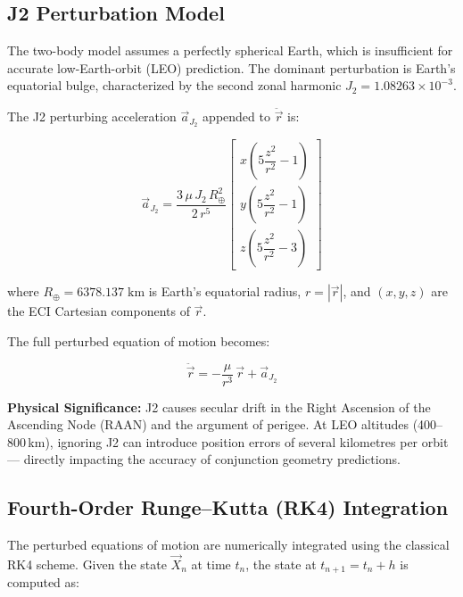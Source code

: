 \documentclass[11pt, a4paper]{article}
\begin{document}
\subsection{J2 Perturbation Model}

The two-body model assumes a perfectly spherical Earth, which is insufficient for accurate
low-Earth-orbit (LEO) prediction. The dominant perturbation is Earth's equatorial bulge,
characterized by the second zonal harmonic $J_2 = 1.08263 \times 10^{-3}$.

The J2 perturbing acceleration $\vec{a}_{J_2}$ appended to $\ddot{\vec{r}}$ is:

\[
  \vec{a}_{J_2} =
  \frac{3\,\mu\,J_2\,R_\oplus^2}{2\,r^5}
  \begin{bmatrix}
    x \!\left(5\dfrac{z^2}{r^2} - 1\right) \\[8pt]
    y \!\left(5\dfrac{z^2}{r^2} - 1\right) \\[8pt]
    z \!\left(5\dfrac{z^2}{r^2} - 3\right)
  \end{bmatrix}
\]

where $R_\oplus = 6378.137\;\text{km}$ is Earth's equatorial radius,
$r = |\vec{r}|$, and $(x, y, z)$ are the ECI Cartesian components of $\vec{r}$.

The full perturbed equation of motion becomes:

\[
  \ddot{\vec{r}} = -\frac{\mu}{r^3}\,\vec{r} + \vec{a}_{J_2}
\]

\begin{infobox}
\textbf{Physical Significance:} J2 causes secular drift in the Right Ascension of the
Ascending Node (RAAN) and the argument of perigee. At LEO altitudes (400--800\,km),
ignoring J2 can introduce position errors of several kilometres per orbit --- directly
impacting the accuracy of conjunction geometry predictions.
\end{infobox}

\newpage
\subsection{Fourth-Order Runge--Kutta (RK4) Integration}

The perturbed equations of motion are numerically integrated using the classical RK4 scheme.
Given the state $\vec{X}_n$ at time $t_n$, the state at $t_{n+1} = t_n + h$ is computed as:
\end{document}
